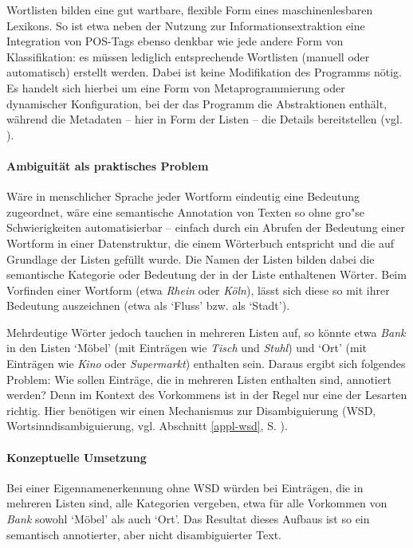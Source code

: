 \documentclass[abstracton, 12pt]{scrartcl}
\begin{document}
Wortlisten bilden eine gut wartbare, flexible Form eines maschinenlesbaren Lexikons. So ist etwa neben der Nutzung zur Informationsextraktion eine Integration von POS-Tags ebenso denkbar wie jede andere Form von Klassifikation: es müssen lediglich entsprechende Wortlisten (manuell oder automatisch) erstellt werden. Dabei ist keine Modifikation des Programms nötig. Es handelt sich hierbei um eine Form von Metaprogrammierung oder dynamischer Konfiguration, bei der das Programm die Abstraktionen enthält, während die Metadaten -- hier in Form der Listen -- die Details bereitstellen (vgl. \citealt[135]{HuntAndThomas2003}).

\paragraph{Ambiguität als praktisches Problem} \label{appl-ie-ambig}

Wäre in menschlicher Sprache jeder Wortform eindeutig eine Bedeutung zugeordnet, wäre eine semantische Annotation von Texten so ohne gro"se Schwierigkeiten automatisierbar -- einfach durch ein Abrufen der Bedeutung einer Wortform in einer Datenstruktur, die einem Wörterbuch entspricht und die auf Grundlage der Listen gefüllt wurde. Die Namen der Listen bilden dabei die semantische Kategorie oder Bedeutung der in der Liste enthaltenen Wörter. Beim Vorfinden einer Wortform (etwa \emph{Rhein} oder \emph{Köln}), lässt sich diese so mit ihrer Bedeutung auszeichnen (etwa als `Fluss' bzw. als `Stadt'). 

Mehrdeutige Wörter jedoch tauchen in mehreren Listen auf, so könnte etwa \emph{Bank} in den Listen `Möbel' (mit Einträgen wie \emph{Tisch} und \emph{Stuhl}) und `Ort' (mit Einträgen wie \emph{Kino} oder \emph{Supermarkt}) enthalten sein. Daraus ergibt sich folgendes Problem: Wie sollen Einträge, die in mehreren Listen enthalten sind, annotiert werden? Denn im Kontext des Vorkommens ist in der Regel nur eine der Lesarten richtig. Hier benötigen wir  einen Mechanismus zur Disambiguierung (WSD, Wortsinndisambiguierung, vgl. Abschnitt \ref{appl-wsd}, S. \pageref{appl-wsd}).

\paragraph{Konzeptuelle Umsetzung}

Bei einer Eigennamenerkennung ohne WSD würden bei Einträgen, die in mehreren Listen sind, alle Kategorien vergeben, etwa für alle Vorkommen von \emph{Bank} sowohl `Möbel' als auch `Ort'. Das Resultat dieses Aufbaus ist so ein semantisch annotierter, aber nicht disambiguierter Text.
\end{document}
